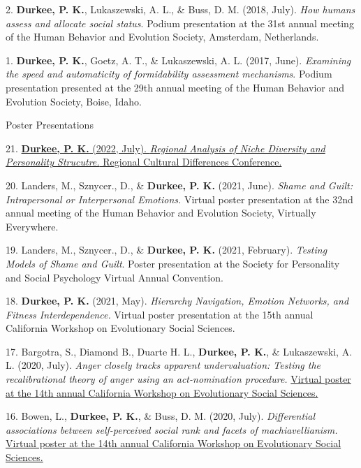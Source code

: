 \documentclass[10pt,]{article}
\begin{document}
2. \hangindent=0.5in \textbf{Durkee, P. K.}, Lukaszewski, A. L., \&
Buss, D. M. (2018, July). \emph{How humans assess and allocate social
status}. Podium presentation at the 31st annual meeting of the Human
Behavior and Evolution Society, Amsterdam, Netherlands.

1. \hangindent=0.5in \textbf{Durkee, P. K.}, Goetz, A. T., \&
Lukaszewski, A. L. (2017, June). \emph{Examining the speed and
automaticity of formidability assessment mechanisms}. Podium
presentation presented at the 29th annual meeting of the Human Behavior
and Evolution Society, Boise, Idaho.

\textcolor{light-gray}{Poster Presentations}

21. \hangindent=0.5in
\href{http://www.pdurkee.com/files/pubs/geo_psych_poster.pdf}{\textbf{Durkee,
P. K.} (2022, July). \emph{Regional Analysis of Niche Diversity and
Personality Strucutre.} Regional Cultural Differences Conference.}

20. \hangindent=0.5in Landers, M., Sznycer., D., \& \textbf{Durkee, P.
K.} (2021, June). \emph{Shame and Guilt: Intrapersonal or Interpersonal
Emotions.} Virtual poster presentation at the 32nd annual meeting of the
Human Behavior and Evolution Society, Virtually Everywhere.

19. \hangindent=0.5in Landers, M., Sznycer., D., \& \textbf{Durkee, P.
K.} (2021, February). \emph{Testing Models of Shame and Guilt}. Poster
presentation at the Society for Personality and Social Psychology
Virtual Annual Convention.

18. \hangindent=0.5in \textbf{Durkee, P. K.} (2021, May).
\emph{Hierarchy Navigation, Emotion Networks, and Fitness
Interdependence.} Virtual poster presentation at the 15th annual
California Workshop on Evolutionary Social Sciences.

17. \hangindent=0.5in Bargotra,
S.\textsuperscript{\faChevronCircleDown}, Diamond
B.\textsuperscript{\faChevronCircleDown}, Duarte H.
L.\textsuperscript{\faChevronCircleDown}, \textbf{Durkee, P. K.}, \&
Lukaszewski, A. L. (2020, July). \emph{Anger closely tracks apparent
undervaluation: Testing the recalibrational theory of anger using an
act-nomination procedure.}
\href{https://baeab2dc-9ca9-4f07-91d9-ca2bf5c551fa.filesusr.com/ugd/e82d4f_4a0dca2931c042a38b24ac60884dd5cd.pdf}{Virtual
poster at the 14th annual California Workshop on Evolutionary Social
Sciences.\textsuperscript{\faFilePdfO}}

16. \hangindent=0.5in Bowen, L.\textsuperscript{\faChevronCircleDown},
\textbf{Durkee, P. K.}, \& Buss, D. M. (2020, July). \emph{Differential
associations between self-perceived social rank and facets of
machiavellianism.}
\href{https://baeab2dc-9ca9-4f07-91d9-ca2bf5c551fa.filesusr.com/ugd/e82d4f_8e49b4d32561449ca6aa7ac9a82738e9.pdf}{Virtual
poster at the 14th annual California Workshop on Evolutionary Social
Sciences.\textsuperscript{\faFilePdfO}}
\end{document}
